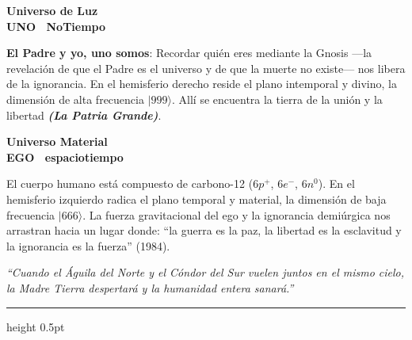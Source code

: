 \documentclass[10pt]{article}
\newcommand{\cruz}{\usebox{\boxCruz}}
\newcommand{\cruzinvertida}{\usebox{\boxCruzInvertida}}
\newcommand{\corazonrojo}{\usebox{\boxCorazonRojo}}
\newcommand{\cerebro}{\usebox{\boxCerebro}}
\begin{document}
\begin{minipage}[T]{0.49\textwidth}
  \noindent
  \begin{minipage}[T]{0.485\textwidth}
    \begin{tcolorbox}[contentStyle, width=\textwidth]
      \centering
      {\small\color{deepblue}\bfseries Universo de Luz}\\[0.01cm]
      {\tiny\color{golddark}\bfseries UNO \corazonrojo\ NoTiempo \cruz}\\[0.01cm]
      \begin{justify}{\fontsize{6.8pt}{7.8pt}\selectfont\color{textgray}
        \textbf{El Padre y yo, uno somos}: Recordar quién eres mediante la Gnosis —la revelación de que el Padre es el universo y de que la muerte no existe— nos libera de la ignorancia. En el hemisferio derecho reside el plano intemporal y divino, la dimensión de alta frecuencia $\vert 999\rangle$. Allí se encuentra la tierra de la unión y la libertad \textit{\textbf{(La Patria Grande)}}.
      }\end{justify}
    \end{tcolorbox}%
  \end{minipage}%
  \hfill
  \begin{minipage}[T]{0.485\textwidth}
    \begin{tcolorbox}[contentStyle, width=\textwidth]
      \centering
      {\small\color{deepblue}\bfseries Universo Material}\\[0.01cm]
      {\tiny\color{golddark}\bfseries EGO \cerebro\ espaciotiempo \cruzinvertida}\\[0.01cm]
      \begin{justify}{\fontsize{6.8pt}{7.8pt}\selectfont\color{textgray}
        El cuerpo humano está compuesto de carbono-12 ($6p^+$, $6e^-$, $6n^0$). En el hemisferio izquierdo radica el plano temporal y material, la dimensión de baja frecuencia $\vert 666\rangle$. La fuerza gravitacional del ego y la ignorancia demiúrgica nos arrastran hacia un lugar donde: \enquote{la guerra es la paz, la libertad es la esclavitud y la ignorancia es la fuerza} (1984).
      }\end{justify}
    \end{tcolorbox}%
  \end{minipage}%
\end{minipage}


\begin{tcolorbox}[finalQuoteStyle, width=\textwidth]
  {\fontsize{10.5pt}{13pt}\selectfont\color{textgray}\itshape
  \enquote{Cuando el Águila del Norte y el Cóndor del Sur vuelen juntos en el mismo cielo, la Madre Tierra despertará y la humanidad entera sanará.}}
\end{tcolorbox}
\begin{center}
    

\vspace{0.5em}
\hrule height 0.5pt
\vspace{0.8em}
\end{center}
\end{document}
